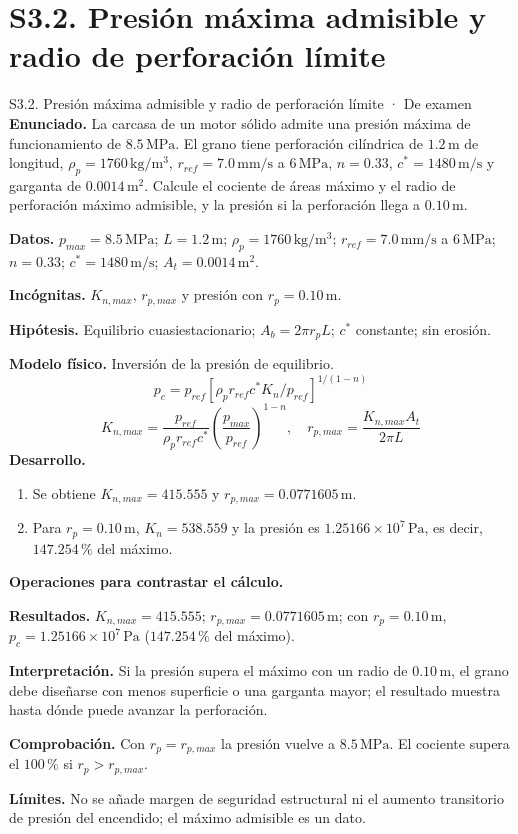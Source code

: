 \section{S3.2. Presión máxima admisible y radio de perforación límite}
\begin{studiumworked}{S3.2. Presión máxima admisible y radio de perforación límite · De examen}
\textbf{Enunciado.} La carcasa de un motor sólido admite una presión máxima de funcionamiento de $8.5\,\mathrm{MPa}$. El grano tiene perforación cilíndrica de $1.2\,\mathrm m$ de longitud, $\rho_p=1760\,\mathrm{kg/m^3}$, $r_{ref}=7.0\,\mathrm{mm/s}$ a $6\,\mathrm{MPa}$, $n=0.33$, $c^*=1480\,\mathrm{m/s}$ y garganta de $0.0014\,\mathrm{m^2}$. Calcule el cociente de áreas máximo y el radio de perforación máximo admisible, y la presión si la perforación llega a $0.10\,\mathrm m$.

\textbf{Datos.} $p_{max}=8.5\,\mathrm{MPa}$; $L=1.2\,\mathrm m$; $\rho_p=1760\,\mathrm{kg/m^3}$; $r_{ref}=7.0\,\mathrm{mm/s}$ a $6\,\mathrm{MPa}$; $n=0.33$; $c^*=1480\,\mathrm{m/s}$; $A_t=0.0014\,\mathrm{m^2}$.

\textbf{Incógnitas.} $K_{n,max}$, $r_{p,max}$ y presión con $r_p=0.10\,\mathrm m$.

\textbf{Hipótesis.} Equilibrio cuasiestacionario; $A_b=2\pi r_pL$; $c^*$ constante; sin erosión.

\textbf{Modelo físico.} Inversión de la presión de equilibrio.
\[p_c=p_{ref}\left[\rho_pr_{ref}c^*K_n/p_{ref}\right]^{1/(1-n)}\]
\[K_{n,max}=\frac{p_{ref}}{\rho_pr_{ref}c^*}\left(\frac{p_{max}}{p_{ref}}\right)^{1-n},\quad r_{p,max}=\frac{K_{n,max}A_t}{2\pi L}\]
\textbf{Desarrollo.}
\begin{enumerate}
\item Se obtiene $K_{n,max}=415.555$ y $r_{p,max}=0.0771605\,\mathrm m$.
\item Para $r_p=0.10\,\mathrm m$, $K_n=538.559$ y la presión es $1.25166\times10^{7}\,\mathrm{Pa}$, es decir, $147.254\,\%$ del máximo.
\end{enumerate}
\textbf{Operaciones para contrastar el cálculo.}

\textbf{Resultados.} $K_{n,max}=415.555$; $r_{p,max}=0.0771605\,\mathrm m$; con $r_p=0.10\,\mathrm m$, $p_c=1.25166\times10^{7}\,\mathrm{Pa}$ ($147.254\,\%$ del máximo).

\textbf{Interpretación.} Si la presión supera el máximo con un radio de $0.10\,\mathrm m$, el grano debe diseñarse con menos superficie o una garganta mayor; el resultado muestra hasta dónde puede avanzar la perforación.

\textbf{Comprobación.} Con $r_p=r_{p,max}$ la presión vuelve a $8.5\,\mathrm{MPa}$. El cociente supera el $100\,\%$ si $r_p>r_{p,max}$.

\textbf{Límites.} No se añade margen de seguridad estructural ni el aumento transitorio de presión del encendido; el máximo admisible es un dato.
\end{studiumworked}
